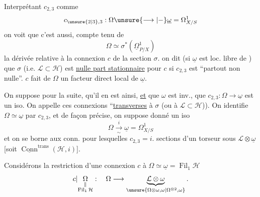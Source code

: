 Interprétant $c_{2,3}$ comme
\[
c_{\unsure{2|3},3}:\Omega\unsure{\longrightarrow|\mathbin{-}}\underline{\omega}=\Omega^1_{X/S}
\]
on voit que c'est aussi, compte tenu de
\[
\Omega\simeq\sigma^*(\underline{\Omega}^1_{P/X})
\]
la dérivée relative à la connexion $c$ de la section $\sigma$. on dit (si $\underline{\omega}$ est loc. libre de ) que $\sigma$ (i.e. $\mathcal{L}\subset\mathcal{H}$) est \uline{nulle part stationnaire} pour $c$ si $c_{2,3}$ est ``partout non nulle''.   $c$ fait de $\Omega$ un facteur direct local de $\underline{\omega}$.

On suppose pour la suite, qu'il en est ainsi, \uline{et} que $\omega$ est inv.,  que $c_{2,3}:\Omega\longrightarrow\underline{\omega}$ est un iso. On appelle ces connexions ``\uline{transverses} à $\sigma$ (ou à $\mathcal{L}\subset\mathcal{H}$)). On identifie $\Omega\simeq\underline{\omega}$ par $c_{2,3}$, et de façon précise, on suppose donné un iso
\[
\Omega\xrightarrow[\sim]{i}\underline{\omega}=\Omega^1_{X/S}
\]
et on se borne aux conn. pour lesquelles $c_{2,3}=i$.   sections d'un torseur sous $\mathcal{L}\otimes\underline{\omega}$ [soit $\underline{\operatorname{Conn}}^{\mathrm{trans}}(\mathcal{H},i)$].

Considérons la restriction d'une connexion $c$ à $\Omega\simeq\underline{\omega}=\operatorname{Fil}_1\mathcal{H}$
\[
c|\underset{\substack{\Vert\\\operatorname{Fil}_1\mathcal{H}}}{\Omega}:\quad
\Omega\longrightarrow\underbrace{\mathcal{L}\otimes\omega}_{\unsure{\Omega\otimes\omega,\omega|\Omega^{\otimes2},\omega}}.
\]
